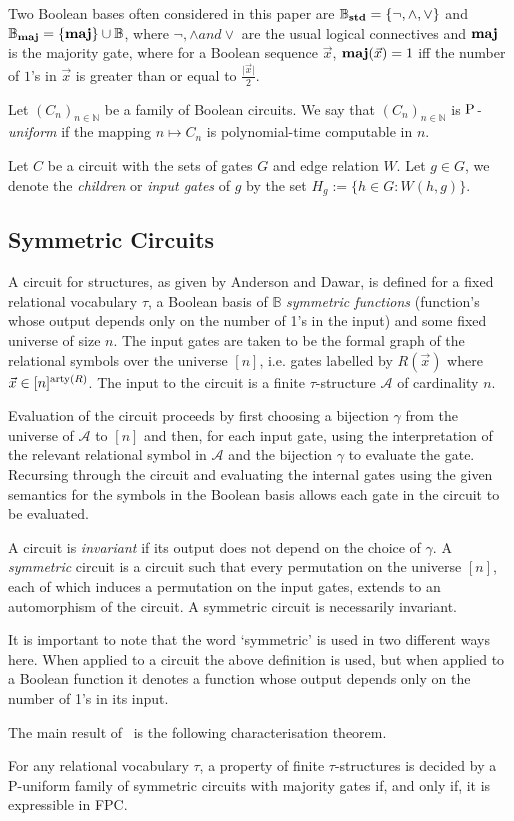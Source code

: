 \documentclass[../paper.tex]{subfiles}
\begin{document}
Two Boolean bases often considered in this paper are $\mathbb{B}_{\text{\textbf{std}}} = \{
\neg , \wedge , \lor \}$ and $\mathbb{B}_{\text{\textbf{maj}}} = \{ \text{\textbf{maj}} \} \cup \mathbb{B}$,
where $\neg, \wedge and \lor$ are the usual logical connectives and $\text{\textbf{maj}}$ is
the majority gate, where for a Boolean sequence $\vec{x}$, $\text{\textbf{maj}}(\vec{x}) = 1$
iff the number of $1$'s in $\vec{x}$ is greater than or equal to
$\frac{\vert\vec{x}\vert}{2}$.


\begin{definition}
  Let $(C_n)_{n \in \mathbb{N}}$ be a family of Boolean circuits. We say that
  $(C_n)_{n \in \mathbb{N}}$ is \emph{$\mathrm{P}$-uniform} if the mapping $n \mapsto
  C_n$ is polynomial-time computable in $n$.
\end{definition}

Let $C$ be a circuit with the sets of gates $G$ and edge relation $W$. Let $g
\in G$, we denote the \emph{children} or \emph{input gates} of $g$ by the set
$H_g := \{h \in G : W(h,g)\}$.

\subsection{Symmetric Circuits}
A circuit for structures, as given by Anderson and Dawar, is defined for a fixed
relational vocabulary $\tau$, a Boolean basis of $\mathbb{B}$ \emph{symmetric
  functions} (function's whose output depends only on the number of 1's in the
input) and some fixed universe of size $n$. The input gates are taken to be the
formal graph of the relational symbols over the universe $[n]$, i.e. gates
labelled by $R(\vec{x})$ where $\vec{x} \in [n]^{\mathrm{arty}(R)}$. The input to the
circuit is a finite $\tau$-structure $\mathcal{A}$ of cardinality $n$.

Evaluation of the circuit proceeds by first choosing a bijection $\gamma$ from
the universe of $\mathcal{A}$ to $[n]$ and then, for each input gate, using the
interpretation of the relevant relational symbol in $\mathcal{A}$ and the
bijection $\gamma$ to evaluate the gate. Recursing through the circuit and
evaluating the internal gates using the given semantics for the symbols in the
Boolean basis allows each gate in the circuit to be evaluated.

A circuit is \emph{invariant} if its output does not depend on the choice of
$\gamma$. A \emph{symmetric} circuit is a circuit such that every permutation on
the universe $[n]$, each of which induces a permutation on the input gates,
extends to an automorphism of the circuit. A symmetric circuit is necessarily
invariant.

It is important to note that the word `symmetric' is used in two different ways
here. When applied to a circuit the above definition is used, but when applied
to a Boolean function it denotes a function whose output depends only on the
number of 1's in its input.

The main result of~\cite{AndersonD17} is the following characterisation theorem.

\begin{thm}
  For any relational vocabulary $\tau$, a property of finite $\tau$-structures
  is decided by a P-uniform family of symmetric circuits with majority gates if,
  and only if, it is expressible in FPC.
\end{thm}
\end{document}
